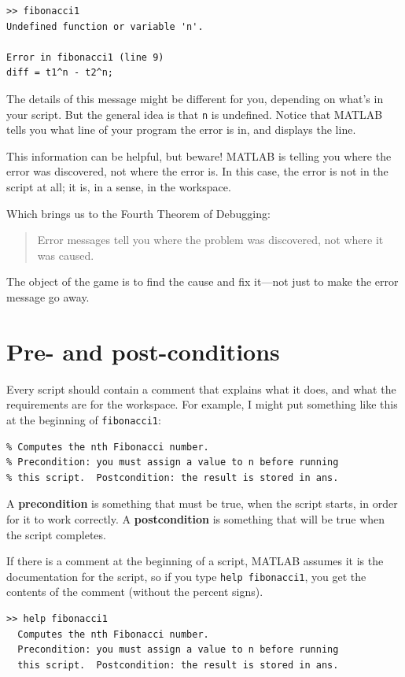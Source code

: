 \documentclass{book}
\begin{document}
\begin{verbatim}
>> fibonacci1
Undefined function or variable 'n'.

Error in fibonacci1 (line 9)
diff = t1^n - t2^n;
\end{verbatim}
 
The details of this message might be different for you, depending
on what's in your script.  But the general idea is that {\tt n}
is undefined.  Notice that MATLAB tells you what line of your
program the error is in, and displays the line.

This information can be helpful, but beware!  MATLAB is telling you
where the error was discovered, not where the error is.  In this
case, the error is not in the script at all; it is, in a sense, in
the workspace.

Which brings us to the Fourth Theorem of Debugging:

\begin{quote}
Error messages tell you where the problem was discovered, not
where it was caused.  
\end{quote}

The object of the game is to find the cause and
fix it---not just to make the error message go away.


\section{Pre- and post-conditions}

Every script should contain a comment that explains
what it does, and what the requirements are for the workspace.  For
example, I might put something like this at the beginning of
{\tt fibonacci1}:

\begin{verbatim}
% Computes the nth Fibonacci number.  
% Precondition: you must assign a value to n before running 
% this script.  Postcondition: the result is stored in ans.
\end{verbatim}

A {\bf precondition} is something that must be true, when the script
starts, in order for it to work correctly.  A {\bf postcondition}
is something that will be true when the script completes.

If there is a comment at the beginning of a script, MATLAB assumes
it is the documentation for the script, so if you type {\tt help
fibonacci1}, you get the contents of the comment (without the percent
signs).

\begin{verbatim}
>> help fibonacci1
  Computes the nth Fibonacci number.  
  Precondition: you must assign a value to n before running 
  this script.  Postcondition: the result is stored in ans.
\end{verbatim}
\end{document}

